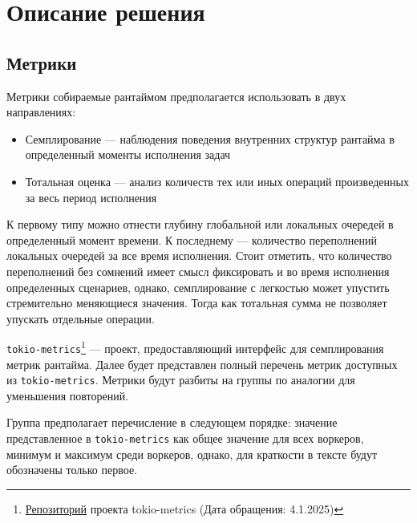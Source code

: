
\section{Описание решения}

\subsection{Метрики}

Метрики собираемые рантаймом предполагается использовать в двух направлениях:

\begin{itemize}
    \item Семплирование --- наблюдения поведения внутренних структур рантайма в определенный моменты исполнения задач
    \item Тотальная оценка --- анализ количеств тех или иных операций произведенных за весь период исполнения
\end{itemize}

К первому типу можно отнести глубину глобальной или локальных очередей в определенный момент времени. К последнему --- количество переполнений локальных очередей за все время исполнения. Стоит отметить, что количество переполнений без сомнений имеет смысл фиксировать и во время исполнения определенных сценариев, однако, семплирование с легкостью может упустить стремительно меняющиеся значения. Тогда как тотальная сумма не позволяет упускать отдельные операции.

\verb|tokio-metrics|\footnote{\href{https://github.com/tokio-rs/tokio-metrics}{Репозиторий} проекта tokio-metrics (Дата обращения: 4.1.2025)} --- проект, предоставляющий интерфейс для семплирования метрик рантайма. Далее будет представлен полный перечень метрик доступных из \verb|tokio-metrics|. Метрики будут разбиты на группы по аналогии для уменьшения повторений.

Группа предполагает перечисление в следующем порядке: значение представленное в \verb|tokio-metrics| как общее значение для всех воркеров, минимум и максимум среди воркеров, однако, для краткости в тексте будут обозначены только первое.

